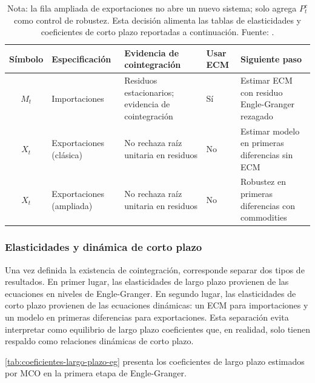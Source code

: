 \documentclass[11pt,a4paper]{article}
\begin{document}
	\begin{table}[H]
		\centering
		\caption{Decisión operativa Engle-Granger.}
		\label{tab:decision-engle-granger}
		\small
		\begin{tabular}{clp{4.0cm}lp{4.3cm}}
			\toprule
			Símbolo & Especificación & Evidencia de cointegración & Usar ECM & Siguiente paso \\
			\midrule
			\(M_t\) & Importaciones &
			Residuos estacionarios; evidencia de cointegración &
			Sí &
			Estimar ECM con residuo Engle-Granger rezagado \\
			\(X_t\) & Exportaciones (clásica) &
			No rechaza raíz unitaria en residuos &
			No &
			Estimar modelo en primeras diferencias sin ECM \\
			\(X_t\) & Exportaciones (ampliada) &
			No rechaza raíz unitaria en residuos &
			No &
			Robustez en primeras diferencias con commodities \\
			\bottomrule
		\end{tabular}
		\caption*{\footnotesize Nota: la fila ampliada de exportaciones no abre un nuevo
			sistema; solo agrega \(P_t^c\) como control de robustez. Esta decisión alimenta
			las tablas de elasticidades y coeficientes de corto plazo reportadas a
			continuación. Fuente:
			.}
	\end{table}
	
	\subsubsection{Elasticidades y dinámica de corto plazo}
	\label{subsubsec:eg-elasticidades-corto-plazo}
	
	Una vez definida la existencia de cointegración, corresponde separar dos tipos
	de resultados. En primer lugar, las elasticidades de largo plazo provienen de
	las ecuaciones en niveles de Engle-Granger. En segundo lugar, las elasticidades
	de corto plazo provienen de las ecuaciones dinámicas: un ECM para importaciones
	y un modelo en primeras diferencias para exportaciones. Esta separación evita
	interpretar como equilibrio de largo plazo coeficientes que, en realidad, solo
	tienen respaldo como relaciones dinámicas de corto plazo.
	
	\autoref{tab:coeficientes-largo-plazo-eg} presenta los coeficientes de largo
	plazo estimados por MCO en la primera etapa de Engle-Granger.
	
\end{document}

